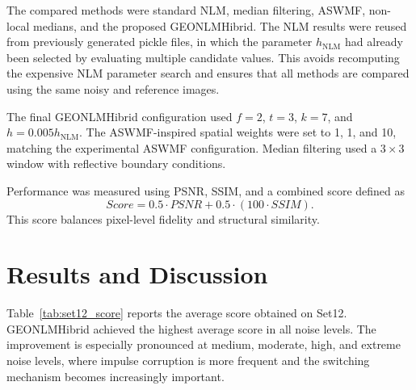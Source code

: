 \documentclass{ieeeaccess}
\begin{document}
The compared methods were standard NLM, median filtering, ASWMF, non-local medians, and the proposed GEONLMHibrid. The NLM results were reused from previously generated pickle files, in which the parameter $h_{\mathrm{NLM}}$ had already been selected by evaluating multiple candidate values. This avoids recomputing the expensive NLM parameter search and ensures that all methods are compared using the same noisy and reference images.

The final GEONLMHibrid configuration used $f=2$, $t=3$, $k=7$, and $h=0.005h_{\mathrm{NLM}}$. The ASWMF-inspired spatial weights were set to 1, 1, and 10, matching the experimental ASWMF configuration. Median filtering used a $3\times3$ window with reflective boundary conditions.

Performance was measured using PSNR, SSIM, and a combined score defined as
\begin{equation}
Score = 0.5\cdot PSNR + 0.5\cdot(100\cdot SSIM).
\label{eq:score}
\end{equation}
This score balances pixel-level fidelity and structural similarity.

\section{Results and Discussion}
\label{sec:results}

Table~\ref{tab:set12_score} reports the average score obtained on Set12. GEONLMHibrid achieved the highest average score in all noise levels. The improvement is especially pronounced at medium, moderate, high, and extreme noise levels, where impulse corruption is more frequent and the switching mechanism becomes increasingly important.
\end{document}
